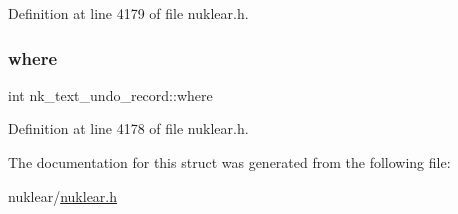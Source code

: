 Definition at line 4179 of file nuklear.\+h.

\mbox{\label{structnk__text__undo__record_a2c32ddd92906ecaca05e6d6a1e6de551}} 
\subsubsection{\texorpdfstring{where}{where}}
{\footnotesize\ttfamily int nk\+\_\+text\+\_\+undo\+\_\+record\+::where}



Definition at line 4178 of file nuklear.\+h.



The documentation for this struct was generated from the following file\+:\begin{DoxyCompactItemize}
\item 
nuklear/\mbox{\hyperlink{nuklear_8h}{nuklear.\+h}}\end{DoxyCompactItemize}

